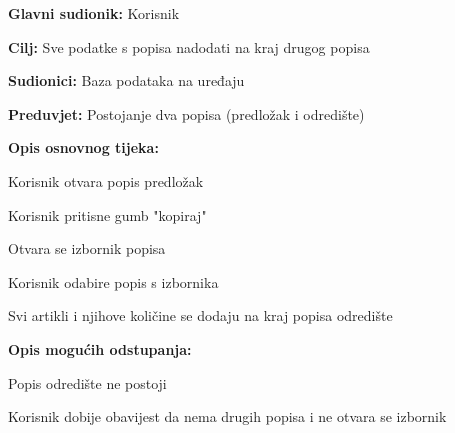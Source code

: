 				
				\noindent {}
				\begin{packed_item}
					\item \textbf{Glavni sudionik:} Korisnik
					\item  \textbf{Cilj:} Sve podatke s popisa nadodati na kraj drugog popisa
					\item  \textbf{Sudionici:} Baza podataka na uređaju
					\item  \textbf{Preduvjet:} Postojanje dva popisa (predložak i odredište)
					\item  \textbf{Opis osnovnog tijeka:}
					\item[] \begin{packed_enum}
						\item Korisnik otvara popis predložak
						\item Korisnik pritisne gumb "kopiraj"
						\item Otvara se izbornik popisa
						\item Korisnik odabire popis s izbornika
						\item Svi artikli i njihove količine se dodaju na kraj popisa odredište
					\end{packed_enum}
					\item  \textbf{Opis mogućih odstupanja:}
					\item[] \begin{packed_item}
						\item[3.a] Popis odredište ne postoji
						\item[] \begin{packed_enum}
							\item Korisnik dobije obavijest da nema drugih popisa i ne otvara se izbornik
						\end{packed_enum}
					\end{packed_item}
				\end{packed_item}
				
